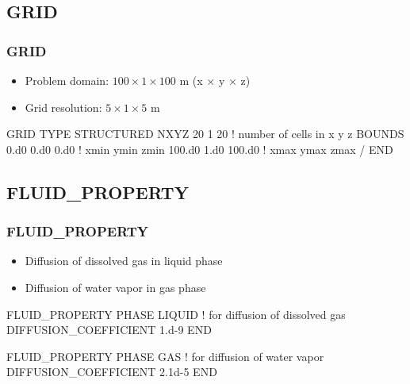 \documentclass{beamer}
\newcommand\redcomment[1]{{{\color{red} #1}}}
\newcommand\bluecomment[1]{{{\color{blue} #1}}}
\begin{document}
\subsection{GRID}

\begin{frame}[fragile]\frametitle{GRID}

\begin{itemize}
  \item Problem domain: $100 \times 1 \times 100$ m (x $\times$ y $\times$ z)
  \item Grid resolution: $5 \times 1 \times 5$ m
\end{itemize}

\begin{semiverbatim}
GRID
  TYPE STRUCTURED
  NXYZ 20 1 20         \bluecomment{! number of cells in x y z}
  BOUNDS
    0.d0 0.d0 0.d0     \bluecomment{! xmin ymin zmin}
    100.d0 1.d0 100.d0 \bluecomment{! xmax ymax zmax}
  /
END
\end{semiverbatim}

\end{frame}

\subsection{FLUID\_PROPERTY}

\begin{frame}[fragile]\frametitle{FLUID\_PROPERTY}
\begin{itemize}
  \item Diffusion of dissolved gas in \redcomment{liquid phase}
  \item Diffusion of water vapor in \redcomment{gas phase}
\end{itemize}

\begin{semiverbatim}

FLUID_PROPERTY
  PHASE LIQUID \bluecomment{! for diffusion of dissolved gas}
  DIFFUSION_COEFFICIENT 1.d-9
END

FLUID_PROPERTY
  PHASE GAS \bluecomment{! for diffusion of water vapor}
  DIFFUSION_COEFFICIENT 2.1d-5
END
\end{semiverbatim}

\end{frame}

\end{document}
